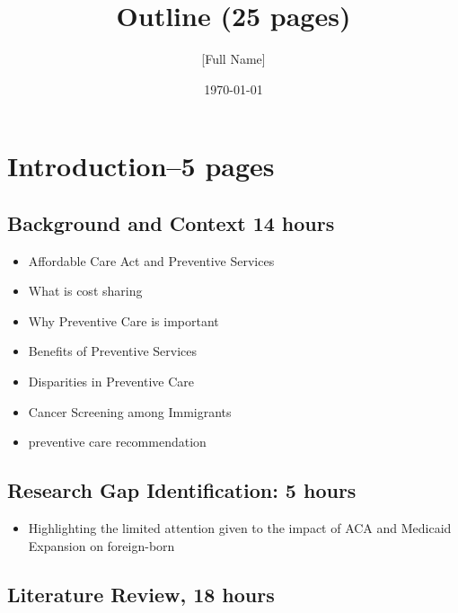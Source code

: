 \documentclass[10pt, oneside]{article}
\title{Outline (25 pages)}
\author{[Full Name]}
\date{\today}
\begin{document}
\maketitle

\vspace{.25in}

\section{Introduction--5 pages}
\subsection {Background and Context 14 hours}
\begin{itemize}
\item Affordable Care Act and Preventive Services
\item What is cost sharing
\item Why Preventive Care is important
\item Benefits of Preventive Services
\item Disparities in Preventive Care 
\item Cancer Screening among Immigrants
\item preventive care recommendation


\end{itemize}


\subsection{Research Gap Identification: 5 hours}
\begin{itemize}
\item Highlighting the limited attention given to the impact of ACA and Medicaid Expansion on foreign-born 
\end{itemize}



\subsection{Literature Review, 18 hours}
\end{document}
